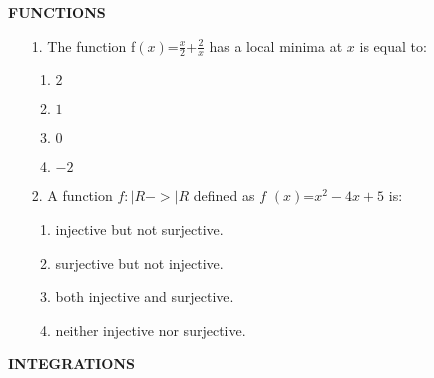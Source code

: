 \documentclass[12pt,-letter paper]{article}
\providecommand{\brak}[1]{\ensuremath{\left(#1\right)}}
\begin{document}
\begin{center}
        \textbf{FUNCTIONS}                                                      \end{center}
      \begin{enumerate}
        \item
 [1.]The function f$\brak{x}$=$\frac{x}{2}$+$\frac{2}{x}$ has a local minima at $x$ is equal to:

                \begin{enumerate}[label={$\brak{\Alph*}$}]
                        \item$2$
                        \item$1$
                        \item$0$
                        \item$-2$
                \end{enumerate}
        \item
 [2.]A function $f:|R->|R $ defined as $ f $ $\brak{x}$=$x^2-4x+5$ is:
                \begin{enumerate}[label={$\brak{\Alph*}$}]
                        \item injective but not surjective.
                        \item surjective but not injective.
                        \item both injective and surjective.
                        \item neither injective nor surjective.
                                \end{enumerate}                                                          \end{enumerate}
                 \begin{center}                                                          \textbf{INTEGRATIONS} 
		 \end{center}                                         
\end{document}
